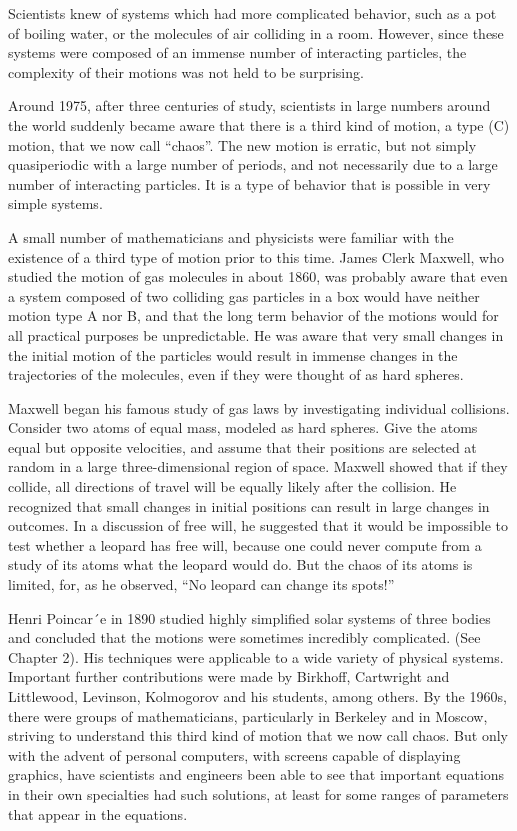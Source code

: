 \documentclass{article}
\begin{document}
Scientists knew of systems which had more complicated behavior, such as
a pot of boiling water, or the molecules of air colliding in a room. However, since
these systems were composed of an immense number of interacting particles, the
complexity of their motions was not held to be surprising.

Around 1975, after three centuries of study, scientists in large numbers
around the world suddenly became aware that there is a third kind of motion, a
type (C) motion, that we now call “chaos”. The new motion is erratic, but not
simply quasiperiodic with a large number of periods, and not necessarily due to
a large number of interacting particles. It is a type of behavior that is possible in
very simple systems.

A small number of mathematicians and physicists were familiar with the
existence of a third type of motion prior to this time. James Clerk Maxwell, who
studied the motion of gas molecules in about 1860, was probably aware that even
a system composed of two colliding gas particles in a box would have neither
motion type A nor B, and that the long term behavior of the motions would for
all practical purposes be unpredictable. He was aware that very small changes
in the initial motion of the particles would result in immense changes in the
trajectories of the molecules, even if they were thought of as hard spheres.

Maxwell began his famous study of gas laws by investigating individual
collisions. Consider two atoms of equal mass, modeled as hard spheres. Give the
atoms equal but opposite velocities, and assume that their positions are selected
at random in a large three-dimensional region of space. Maxwell showed that if
they collide, all directions of travel will be equally likely after the collision. He
recognized that small changes in initial positions can result in large changes in
outcomes. In a discussion of free will, he suggested that it would be impossible
to test whether a leopard has free will, because one could never compute from a
study of its atoms what the leopard would do. But the chaos of its atoms is limited,
for, as he observed, “No leopard can change its spots!”

Henri Poincar´e in 1890 studied highly simplified solar systems of three
bodies and concluded that the motions were sometimes incredibly complicated.
(See Chapter 2). His techniques were applicable to a wide variety of physical
systems. Important further contributions were made by Birkhoff, Cartwright and
Littlewood, Levinson, Kolmogorov and his students, among others. By the 1960s,
there were groups of mathematicians, particularly in Berkeley and in Moscow,
striving to understand this third kind of motion that we now call chaos. But
only with the advent of personal computers, with screens capable of displaying
graphics, have scientists and engineers been able to see that important equations
in their own specialties had such solutions, at least for some ranges of parameters
that appear in the equations.
\end{document}
